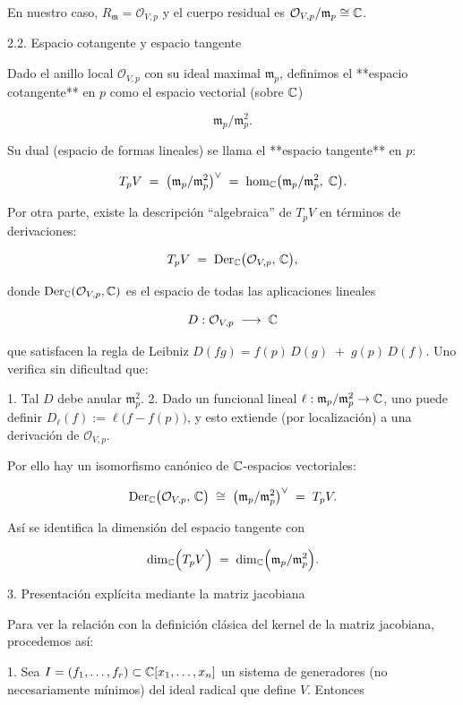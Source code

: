 En nuestro caso, $R_{\mathfrak m} = \mathcal O_{V,p}$ y el cuerpo residual es $\mathcal O_{V,p}/\mathfrak m_p \cong \mathbb{C}$.

2.2. Espacio cotangente y espacio tangente

Dado el anillo local $\mathcal O_{V,p}$ con su ideal maximal $\mathfrak m_p$, definimos el **espacio cotangente** en $p$ como el espacio vectorial (sobre $\mathbb{C}$)

$$
  \mathfrak m_p / \mathfrak m_p^2.
$$

Su dual (espacio de formas lineales) se llama el **espacio tangente** en $p$:

$$
  T_p V \;=\; \bigl(\mathfrak m_p / \mathfrak m_p^2\bigr)^{\vee} \;=\; \hom_{\mathbb{C}}\bigl(\mathfrak m_p / \mathfrak m_p^2,\;\mathbb{C}\bigr).
$$

Por otra parte, existe la descripción “algebraica” de $T_p V$ en términos de derivaciones:

$$
  T_p V \;=\; \mathrm{Der}_{\mathbb{C}}\bigl(\mathcal O_{V,p},\,\mathbb{C}\bigr),
$$

donde $\mathrm{Der}_{\mathbb{C}}(\mathcal O_{V,p},\mathbb{C})$ es el espacio de todas las aplicaciones lineales

$$
  D: \mathcal O_{V,p} \;\longrightarrow\; \mathbb{C}
$$

que satisfacen la regla de Leibniz $D(fg) = f(p)\,D(g) \;+\; g(p)\,D(f)$.  Uno verifica sin dificultad que:

1. Tal $D$ debe anular $\mathfrak m_p^2$.
2. Dado un funcional lineal $\ell : \mathfrak m_p/\mathfrak m_p^2 \to \mathbb{C}$, uno puede definir $D_\ell(f) := \ell\bigl(f - f(p)\bigr)$, y esto extiende (por localización) a una derivación de $\mathcal O_{V,p}$.

Por ello hay un isomorfismo canónico de $\mathbb{C}$-espacios vectoriales:

$$
  \mathrm{Der}_{\mathbb{C}}\bigl(\mathcal O_{V,p},\,\mathbb{C}\bigr)
  \;\cong\;
  \bigl(\mathfrak m_p / \mathfrak m_p^2\bigr)^{\vee}
  \;=\; T_p V.
$$

Así se identifica la dimensión del espacio tangente con

$$
  \dim_{\mathbb{C}}\Bigl(T_p V\Bigr)
  \;=\;
  \dim_{\mathbb{C}}\Bigl(\mathfrak m_p / \mathfrak m_p^2\Bigr).
$$


3. Presentación explícita mediante la matriz jacobiana

Para ver la relación con la definición clásica del kernel de la matriz jacobiana, procedemos así:

1. Sea $I = (f_1,\dots,f_r)\subset \mathbb{C}[x_1,\dots,x_n]$ un sistema de generadores (no necesariamente mínimos) del ideal radical que define $V$.  Entonces

